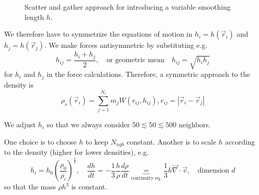 \begin{figure}[!htb]
 \centering
 \hfill
 \caption{Scatter and gather approach for introducing a variable smoothing length $h$.}
 \label{fig:scatter_gather}
\end{figure}


We therefore have to symmetrize the equations of motion in $h_i = h(\vec{r}_i)$ and $h_j = h(\vec{r}_j)$.
We make forces antisymmetric by substituting e.g.
\begin{equation}
    h_{ij} = \frac{h_i + h_j}{2}, \quad \text{or geometric mean} \quad h_{ij} = \sqrt{h_i h_j}
\end{equation}
for $h_i$ and $h_j$ in the force calculations.
Therefore, a symmetric approach to the density is
\begin{equation}
    \rho_s\left(\vec{r}_i\right)=\sum_{j=1}^{N_i} m_j W\left(r_{i j}, h_{i j}\right), r_{i j}=\left|\vec{r}_i-\vec{r}_j\right|
\end{equation}


We adjust $h_i$ so that we always consider $50 \lesssim 50 \lesssim 500$ neighbors.

One choice is to choose $h$ to keep $N_{ngb}$ constant. Another
is to scale $h$ according to the density (higher for lower densities), e.g.
\begin{equation}
    h_i = h_0 \left( \frac{\rho_0}{\rho_i} \right)^{\frac{1}{3}}, \quad \frac{dh}{dt} = - \frac{1}{3} \frac{h}{\rho} \frac{d\rho}{dt} \underbrace{=}_{\text{continuity eq.}} \frac{1}{3} h \vec{\nabla} \cdot \vec{v}, \quad \text{dimension } d
\end{equation}
so that the mass $\rho h^3$ is constant.

